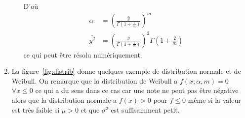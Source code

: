 \begin{enumerate}
\begin{itemize}
        D'où
        \begin{align*}
          \alpha & = \left(\frac{\bar{y}}{\Gamma\left(1 + \frac{1}{m}\right)}\right)^m\\
          \bar{y^2} & = \left(\frac{\bar{y}}{\Gamma\left(1 + \frac{1}{m}\right)}\right)^2\Gamma\left(1 + \frac{2}{m}\right)
        \end{align*}
        ce qui peut être résolu numériquement.
    \end{itemize}
  \item
    La figure~\ref{fig:distrib} donne quelques exemple de distribution normale et de Weibull.
    On remarque que la distribution de Weibull a $f(x; \alpha, m) = 0$ $\forall x \leq 0$
    ce qui a du sens dans ce cas car une note ne peut pas être négative alors que
    la distribution normale a $f(x) > 0$ pour $f \leq 0$ même si la valeur est très faible
    si $\mu > 0$ et que $\sigma^2$ est suffisamment petit.


\end{enumerate}
